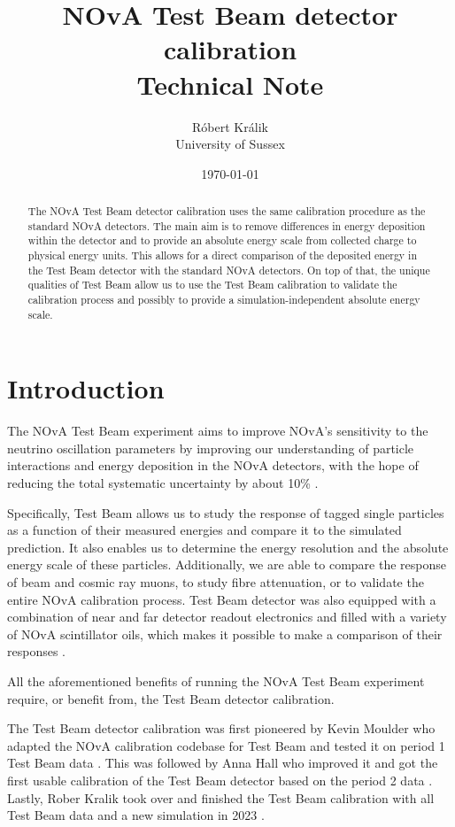 \documentclass[12pt,a4paper]{article}
\author{Róbert Králik\\\small{University of Sussex}}
\title{\textbf{NOvA Test Beam detector calibration\\ \vspace*{5mm}
\Large{Technical Note}}}
\date{\today}
\begin{document}
\maketitle
\begin{abstract}
The NOvA Test Beam detector calibration uses the same calibration procedure as the standard NOvA detectors. The main aim is to remove differences in energy deposition within the detector and to provide an absolute energy scale from collected charge to physical energy units. This allows for a direct comparison of the deposited energy in the Test Beam detector with the standard NOvA detectors. On top of that, the unique qualities of Test Beam allow us to use the Test Beam calibration to validate the calibration process and possibly to provide a simulation-independent absolute energy scale.
\end{abstract}
\newpage
\tableofcontents
\newpage

\section{Introduction}

The NOvA Test Beam experiment aims to improve NOvA's sensitivity to the neutrino oscillation parameters by improving our understanding of particle interactions and energy deposition in the NOvA detectors, with the hope of reducing the total systematic uncertainty by about 10\% \cite{NOVA-doc-33012}.
 
Specifically, Test Beam allows us to study the response of tagged single particles as a function of their measured energies and compare it to the simulated prediction. It also enables us to determine the energy resolution and the absolute energy scale of these particles. Additionally, we are able to compare the response of beam and cosmic ray muons, to study fibre attenuation, or to validate the entire NOvA calibration process. Test Beam detector was also equipped with a combination of near and far detector readout electronics and filled with a variety of NOvA scintillator oils, which makes it possible to make a comparison of their responses \cite{NOVA-doc-15750}.

All the aforementioned benefits of running the NOvA Test Beam experiment require, or benefit from, the Test Beam detector calibration.

The Test Beam detector calibration was first pioneered by Kevin Moulder who adapted the NOvA calibration codebase for Test Beam and tested it on period 1 Test Beam data \cite{NOVA-doc-42700}. This was followed by Anna Hall who improved it and got the first usable calibration of the Test Beam detector based on the period 2 data \cite{NOVA-doc-50786}. Lastly, Rober Kralik took over and finished the Test Beam calibration with all Test Beam data and a new simulation in 2023 \cite{NOVA-doc-59024}.
\end{document}
